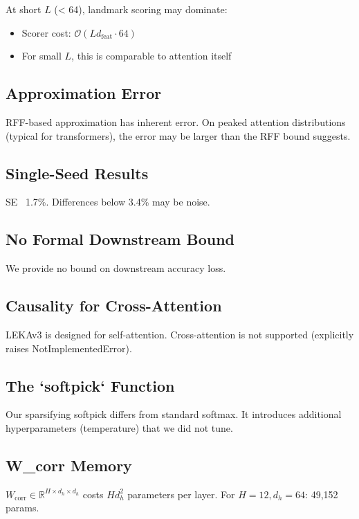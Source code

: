 At short $L$ (\textless{} 64), landmark scoring may dominate:
\begin{itemize}
\item Scorer cost: $\mathcal{O}(L d_\text{feat} \cdot 64)$
\item For small $L$, this is comparable to attention itself

\end{itemize}
\subsection{Approximation Error}

RFF-based approximation has inherent error. On peaked attention 
distributions (typical for transformers), the error may be larger than 
the RFF bound suggests.

\subsection{Single-Seed Results}

SE ~1.7\%. Differences below 3.4\% may be noise.

\subsection{No Formal Downstream Bound}

We provide no bound on downstream accuracy loss.

\subsection{Causality for Cross-Attention}

LEKAv3 is designed for self-attention. Cross-attention is not supported 
(explicitly raises NotImplementedError).

\subsection{The `softpick` Function}

Our sparsifying softpick differs from standard softmax. It introduces 
additional hyperparameters (temperature) that we did not tune.

\subsection{W\_corr Memory}

$W_\text{corr} \in \mathbb{R}^{H \times d_h \times d_h}$ costs 
$H d_h^2$ parameters per layer. For $H = 12, d_h = 64$: 49,152 params.


